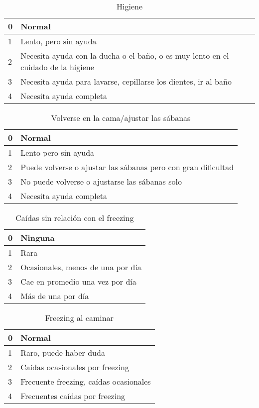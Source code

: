 \begin{table}[H]
\begin{center}
\begin{tabular}{|p{1cm}|p{11cm}|}
\hline
0 & Normal \\\hline
1 & Lento, pero sin ayuda \\\hline
2 & Necesita ayuda con la ducha o el baño, o es muy lento en el cuidado de la higiene\\\hline
3 & Necesita ayuda para lavarse, cepillarse los dientes, ir al baño\\\hline
4 & Necesita ayuda completa\\\hline
\end{tabular}
\caption{Higiene}
\end{center}
\end{table}

\begin{table}[H]
\begin{center}
\begin{tabular}{|p{1cm}|p{11cm}|}
\hline
0 & Normal \\\hline
1 & Lento pero sin ayuda \\\hline
2 & Puede volverse o ajustar las sábanas pero con gran dificultad\\\hline
3 & No puede volverse o ajustarse las sábanas solo \\\hline
4 & Necesita ayuda completa\\\hline
\end{tabular}
\caption{ Volverse en la cama/ajustar las sábanas}
\end{center}
\end{table}

\begin{table}[H]
\begin{center}
\begin{tabular}{|p{1cm}|p{11cm}|}
\hline
0 & Ninguna \\\hline
1 & Rara \\\hline
2 & Ocasionales, menos de una por día \\\hline
3 &  Cae en promedio una vez por día \\\hline
4 & Más de una por día\\\hline
\end{tabular}
\caption{Caídas sin relación con el freezing}
\end{center}
\end{table}

\begin{table}[H]
\begin{center}
\begin{tabular}{|p{1cm}|p{11cm}|}
\hline
0 & Normal \\\hline
1 & Raro, puede haber duda \\\hline
2 & Caídas ocasionales por freezing\\\hline
3 & Frecuente freezing, caídas ocasionales \\\hline
4 & Frecuentes caídas por freezing\\\hline
\end{tabular}
\caption{Freezing al caminar}
\end{center}
\end{table} 

